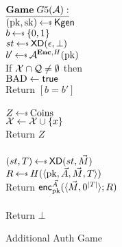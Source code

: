\begin{figure}
\begin{center}
{
$\gamev{G5}{\advA}$\\
 $(\pk,\sk)\getsr\Kgen$\\
 $b \getsr \bits$ \\
 $st \getsr \mdalg(\epsilon,\bot)$\\
 $b' \getsr \advA^{\encOracle,H}(\pk)$\\
 If $\mathcal{X} \cap \mathcal{Q} \neq \emptyset$ then \\
\nudge $\mathrm{BAD} \gets\textsf{true}$\\
Return $[b=b']$\\ 

\medskip
{}\\
  $Z \getsr \mathrm{Coins}$\\
  $\mathcal{X} \gets \mathcal{X} \cup \{x\}$\\
  Return $Z$\\
  
  \medskip
\procedurev{$\encOracle(\vad,\vmsg)$}\\
$(st, T) \getsr \mdalg(st,\vmsg)$\\
$R \getsr H(\langle \pk,\vad,\vmsg,\umd\rangle)$\\
Return ${\mathsf{enc}}_{\mathrm{pk}}^{\vec{A}}(\langle \vec{M},0^{|T|}\rangle; R)$\\

\medskip
{}\\
Return $\bot$
}\caption{Additional Auth Game}
\end{center}
\end{figure}

